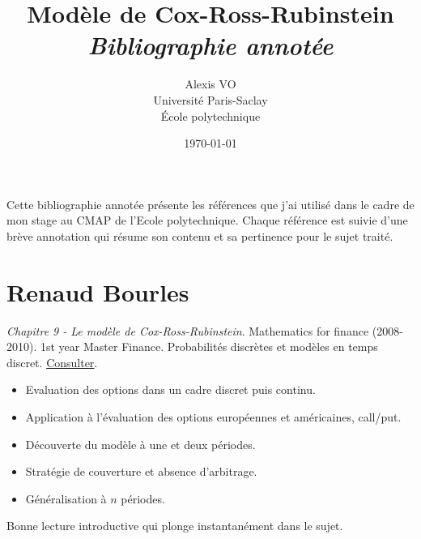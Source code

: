 \documentclass[a4paper,10pt]{article}
\title{\Huge{\textbf{Modèle de Cox-Ross-Rubinstein}}\\ \medskip
      \Huge{\textit{Bibliographie annotée}}\vspace*{0.7cm}}
\author{\LARGE{Alexis VO}\vspace{1cm}\\ \medskip
      Université Paris-Saclay\\École polytechnique}
\date{\vspace{0.2cm}\today}
\begin{document}
\vspace{\fill}
  \maketitle
\vspace{\fill}

\newpage

Cette bibliographie annotée présente les références que j'ai utilisé dans le cadre de mon stage au CMAP de l'Ecole polytechnique. Chaque référence est suivie d'une brève annotation qui résume son contenu et sa pertinence pour le sujet traité.\\ \medskip

\begin{center}
    \tableofcontents    
\end{center}

\newpage

\vspace{1em}

\section*{Renaud Bourles\quad}
{}

\textit{Chapitre 9 - Le modèle de Cox-Ross-Rubinstein}. Mathematics for finance (2008-2010). 1st year Master Finance. Probabilités discrètes et modèles en temps discret. \href{http://renaud.bourles.perso.centrale-med.fr/MathsFi/Chap%209%20-%20Le%20modele%20Cox-Ross-Rubinstein.pdf}{Consulter}.
\begin{itemize}
    \item Evaluation des options dans un cadre discret puis continu.
    \item Application à l'évaluation des options européennes et américaines, call/put.
    \item Découverte du modèle à une et deux périodes.
    \item Stratégie de couverture et absence d'arbitrage.
    \item Généralisation à $n$ périodes.
\end{itemize}
Bonne lecture introductive qui plonge instantanément dans le sujet.\\ 

\vspace{1em}
\end{document}
